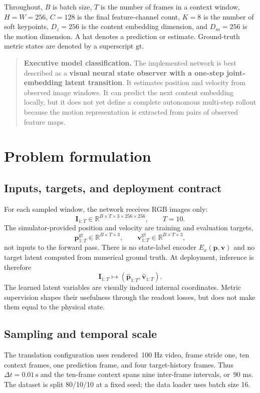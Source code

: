 \documentclass[11pt,a4paper]{article}
\newcommand{\R}{\mathbb{R}}\newcommand{\norm}[1]{\left\lVert #1\right\rVert}\newcommand{\E}{\mathbb{E}}\newcommand{\dt}{\Delta t}
\begin{document}
Throughout, $B$ is batch size, $T$ is the number of frames in a context window, $H=W=256$, $C=128$ is the final feature-channel count, $K=8$ is the number of soft keypoints, $D_z=256$ is the content embedding dimension, and $D_m=256$ is the motion dimension. A hat denotes a prediction or estimate. Ground-truth metric states are denoted by a superscript $\mathrm{gt}$.

\begin{quote}\textbf{Executive model classification.} 
The implemented network is best described as a \textbf{visual neural state observer with a one-step joint-embedding latent transition}. It estimates position and velocity from observed image windows. It can predict the next content embedding locally, but it does not yet define a complete autonomous multi-step rollout because the motion representation is extracted from pairs of observed feature maps.
\end{quote}

\section{Problem formulation}
\subsection{Inputs, targets, and deployment contract}
For each sampled window, the network receives RGB images only:
\begin{equation}
\bm I_{1:T}\in\R^{B\times T\times 3\times256\times256},\qquad T=10.
\end{equation}
The simulator-provided position and velocity are training and evaluation targets,
\begin{equation}
\bm p^{\mathrm{gt}}_{1:T}\in\R^{B\times T\times3},\qquad
\bm v^{\mathrm{gt}}_{1:T}\in\R^{B\times T\times3},
\end{equation}
not inputs to the forward pass. There is no state-label encoder $E_x(\bm p,\bm v)$ and no target latent computed from numerical ground truth. At deployment, inference is therefore
\begin{equation}
\bm I_{1:T}\longmapsto(\widehat{\bm p}_{1:T},\widehat{\bm v}_{1:T}).
\end{equation}
The learned latent variables are visually induced internal coordinates. Metric supervision shapes their usefulness through the readout losses, but does not make them equal to the physical state.

\subsection{Sampling and temporal scale}
The translation configuration uses rendered \,100 Hz video, frame stride one, ten context frames, one prediction frame, and four target-history frames. Thus $\dt=0.01\,\mathrm{s}$ and the ten-frame context spans nine inter-frame intervals, or \,90 ms. The dataset is split 80/10/10 at a fixed seed; the data loader uses batch size 16.
\end{document}

